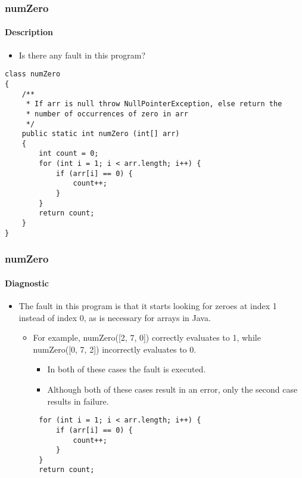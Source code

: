 \begin{frame}[hasprev=false, hasnext=true, fragile]
\label{example:numzero}
\frametitle{numZero}
\framesubtitle{Description}

\begin{itemize}
	\item Is there any fault in this program?
\end{itemize}

\begin{lstlisting}
class numZero
{
    /**
     * If arr is null throw NullPointerException, else return the
     * number of occurrences of zero in arr
     */
    public static int numZero (int[] arr)
    {
        int count = 0;
        for (int i = 1; i < arr.length; i++) {
            if (arr[i] == 0) {
                count++;
            }
        }
        return count;
    }
}
\end{lstlisting}
\end{frame}


\begin{frame}[hasprev=true, hasnext=true, fragile]
\frametitle{numZero}
\framesubtitle{Diagnostic}

\begin{itemize}
	\item The fault in this program is that it starts looking for zeroes at
	index 1 instead of index 0, as is necessary for arrays in Java.
	\begin{itemize}
		\item For example, numZero([2, 7, 0]) correctly evaluates to 1, while
		numZero([0, 7, 2]) incorrectly evaluates to 0.
		\begin{itemize}
			\item In both of these cases the fault is executed.

			\item Although both of these cases result in an error, only the
			second case results in failure.
		\end{itemize}
	 \end{itemize}
\end{itemize}

\begin{lstlisting}
        for (int i = 1; i < arr.length; i++) {
            if (arr[i] == 0) {
                count++;
            }
        }
        return count;
\end{lstlisting}
\end{frame}


